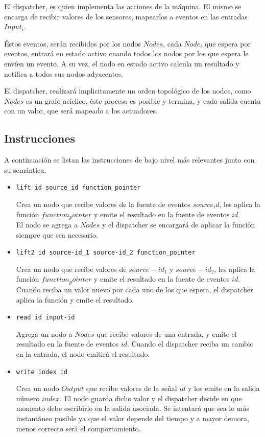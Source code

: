 \begin{enumerate}
El dispatcher, es quien implementa las acciones de la máquina.
El mismo se encarga de recibir valores de los sensores, mapearlos
a eventos en las entradas $Input_i$.

Éstos eventos, serán recibidos por los nodos $Nodes$, cada $Node_i$
que espera por eventos, entrará en estado activo cuando todos los nodos
por los que espera le envíen un evento.
A su vez, el nodo en estado activo calcula un resultado y notifica a
todos sus nodos adyacentes.

El dispatcher, realizará implicitamente un orden topológico de los
nodos, como $Nodes$ es un grafo acíclico, éste proceso es posible y termina, y cada
salida cuenta con un valor, que será mapeado a los actuadores.

\end{enumerate}

\subsection{Instrucciones}

  A continuación se listan las instrucciones de bajo nivel
  más relevantes junto con su semántica.

\begin{itemize}
\item \texttt{lift id source\_id function\_pointer}

 Crea un nodo que recibe valores de la fuente de
 eventos $source_id$,
 les aplica la función $function_pointer$ y emite el resultado
 en la fuente de eventos $id$.\\
 El nodo se agrega a $Nodes$ y el dispatcher se encargará de aplicar
 la función siempre que sea necesario.

\item \texttt{lift2 id source-id\_1 source-id\_2 function\_pointer}

 Crea un nodo que recibe valores de $source-id_1$ y
 $source-id_2$,
 les aplica la función $function_pointer$ y emite el resultado
 en la fuente de eventos $id$.\\
 Cuando reciba un valor nuevo por cada uno de los que espera, el
 dispatcher aplica la función y emite el resultado.

\item \texttt{read id input-id}

 Agrega un nodo a $Nodes$ que recibe valores de una entrada,
 y emite el resultado en la fuente de eventos $id$.
 Cuando el dispatcher reciba un cambio en la entrada, el nodo emitirá
 el resultado.

\item \texttt{write index id}

  Crea un nodo $Output$ que recibe valores de la señal $id$
  y los emite en la salida número $index$.
  El nodo guarda dicho valor y el dispatcher decide en que momento
  debe escribirlo en la salida asociada.
  Se intentará que sea lo más instantáneo posible
  ya que el valor depende del tiempo y a mayor demora, menos correcto
  será el comportamiento.

\end{itemize}


